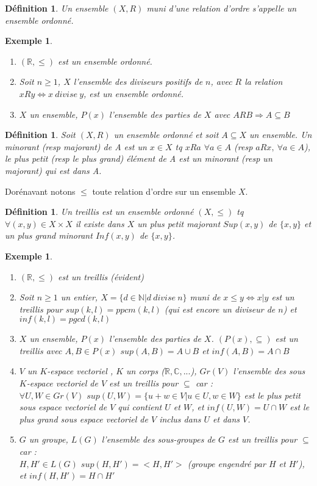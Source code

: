\documentclass[a4paper, oneside]{report}
\theoremstyle{break}
\newtheorem{defi}[thm]{Définition}
\newtheorem{exem}[thm]{Exemple}
\newcommand{\x}{\times}
\newcommand{\R}{\mathbb{R}}
\newcommand{\N}{\mathbb{N}}
\newcommand{\C}{\mathbb{C}}
\newcommand{\sev}{sous espace vectoriel }
\newcommand{\ev}{espace vectoriel }
\begin{document}
\begin{defi}
	Un ensemble $(X,R)$ muni d'une relation d'ordre s'appelle un ensemble ordonné.
\end{defi}

\begin{exem}
	\begin{enumerate}
		\item $(\R,\leq )$ est un ensemble ordonné.
		\item Soit $n\geq 1$, $X$ l'ensemble des diviseurs positifs de $n$, avec $R$ la relation $xRy \Leftrightarrow x~divise~y$, est un ensemble ordonné.\\
		\item $X$ un ensemble, $P(x)$ l'ensemble des parties de $X$ avec $ARB\Rightarrow A\subseteq B$
	\end{enumerate}	
\end{exem}

\begin{defi}
	Soit $(X,R)$ un ensemble ordonné et soit $A\subseteq X$ un ensemble. Un minorant (resp majorant) de A est un $x\in X$ tq $xRa$ $\forall a \in A$ (resp $aRx,~\forall a\in A$), le plus petit (resp le plus grand) élément de A est un minorant (resp un majorant) qui est dans A.
\end{defi}

Dorénavant notons $\leq $ toute relation d'ordre sur un ensemble $X$.

\begin{defi}
	Un treillis est un ensemble ordonné $(X, \leq )$ tq $\forall (x,y)\in X\x X$ il existe dans $X$ un plus petit majorant $Sup(x,y)$ de $\{x,y\}$ et un plus grand minorant $Inf(x,y)$ de $\{x,y\}$.
\end{defi}

\begin{exem}
	\begin{enumerate}
		\item $(\R , \leq)$ est un treillis (évident)
		\item Soit $n\geq 1$ un entier, $X=\{d\in \N | d~divise~n \}$ muni de $x\leq y \Leftrightarrow x|y$ est un treillis pour $sup(k,l)=ppcm(k,l)$ (qui est encore un diviseur de $n$) et $inf(k,l)=pgcd(k,l)$
		\item $X$ un ensemble, $P(x)$ l'ensemble des parties de $X$. $(P(x),\subseteq)$ est un treillis avec $A,B\in P(x)$ $sup(A,B)=A\cup B$ et $inf(A,B)=A\cap B$
		\item $V$ un $K$-\ev, $K$ un corps ($\R,\C,...$), $Gr(V)$ l'ensemble des sous $K$-\ev de $V$ est un treillis pour $\subseteq$ car :\\
		$\forall U,W\in Gr(V)$ $sup(U,W)=\{u+w\in V |u\in U,w\in W \}$ est le plus petit \sev de $V$ qui contient $U$ et $W$, et $inf(U,W)=U\cap W$ est le plus grand \sev de $V$ inclus dans $U$ et dans $V$.\\
		\item $G$ un groupe, $L(G)$ l'ensemble des sous-groupes de $G$ est un treillis pour $\subseteq$ car :\\
		$H,H'\in L(G)$ $sup(H,H')=<H,H'>$ (groupe engendré par $H$ et $H'$), et $inf(H,H')=H\cap H'$
	\end{enumerate}
\end{exem}
\end{document}
